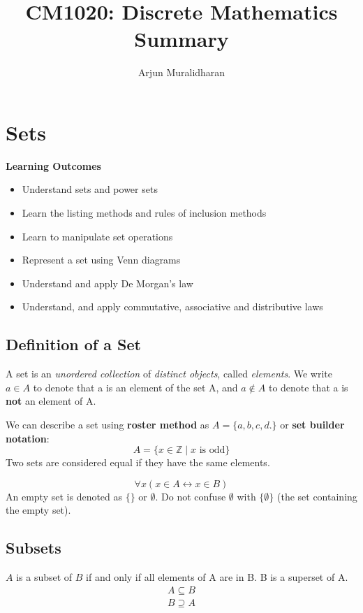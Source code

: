 
\title{CM1020: Discrete Mathematics \\ Summary}
\author{Arjun Muralidharan}



\section{Sets}
\begin{mdframed}
\textbf{Learning Outcomes}
\begin{itemize}[label={\( \checkmark \)}]
\item Understand sets and power sets
\item Learn the listing methods and rules of inclusion methods
\item Learn to manipulate set operations
\item Represent a set using Venn diagrams
\item Understand and apply De Morgan’s law
\item Understand, and apply commutative, associative and distributive laws
\end{itemize}
\end{mdframed}

\subsection{Definition of a Set}
A set is an \emph{unordered collection} of \emph{distinct objects}, called \emph{elements}. We write \(	a \in A\) to denote that a is an element of the set A, and \(a \notin A\) to denote that a is \textbf{not} an element of A.

We can describe a set using \textbf{roster method} as \(A = \{a,b,c,d.\} \) or \textbf{set builder notation}: \[ A = \{ x \in \mathbb{Z} \mid x \textrm{ is odd} \} \]
Two sets are considered equal if they have the same elements.

\[
\forall x(x \in A \leftrightarrow x \in B)
\]
An empty set is denoted as \( \{ \} \) or \( \emptyset \). Do not confuse \( \emptyset \) with \( \{ \emptyset \} \) (the set containing the empty set).

\subsection{Subsets}
\(A\) is a subset of \(B\) if and only if all elements of A are in B. B is a superset of A.
\begin{gather*}
		A \subseteq B \\
	B \supseteq A
\end{gather*}

